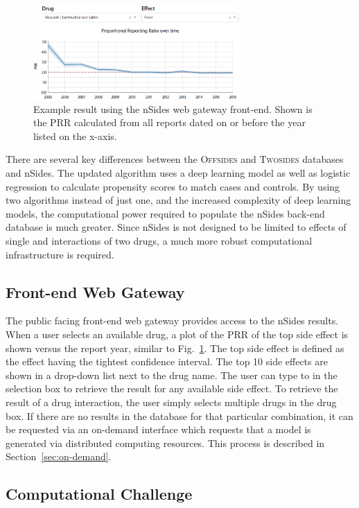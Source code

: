 \documentclass{ws-procs11x85}
\begin{document}
\begin{figure}[h]
\centerline{\includegraphics[width=0.7\textwidth]{prr}}
\caption{Example result using the nSides web gateway front-end. Shown
  is the PRR calculated from all reports dated on or before the year listed on the
  x-axis.}
\label{fig:prr}
\end{figure}

There are several key differences between the O\textsc{ffsides} and
T\textsc{wosides} databases and nSides. The updated algorithm uses a
deep learning model as well as logistic regression to calculate
propensity scores to match cases and controls. By using two algorithms
instead of just one, and the increased complexity of deep learning
models, the computational power required to populate the nSides
back-end database is much greater. Since nSides is not designed to be
limited to effects of single and interactions of two drugs, a much
more robust computational infrastructure is required.

\subsection{Front-end Web Gateway}
The public facing front-end web gateway provides access to the nSides
results. When a user selects an available drug, a plot of the PRR of
the top side effect is shown versus the report year, similar to
Fig.~\ref{fig:prr}.  The top side effect is defined as the effect
having the tightest confidence interval. The top 10 side effects are
shown in a drop-down list next to the drug name. The user can type to
in the selection box to retrieve the result for any available side
effect. To retrieve the result of a drug interaction, the user simply
selects multiple drugs in the drug box. If there are no results in the
database for that particular combination, it can be requested via an
on-demand interface which requests that a model is generated via
distributed computing resources.  This process is described in
Section~\ref{sec:on-demand}.

\subsection{Computational Challenge}
\end{document}
